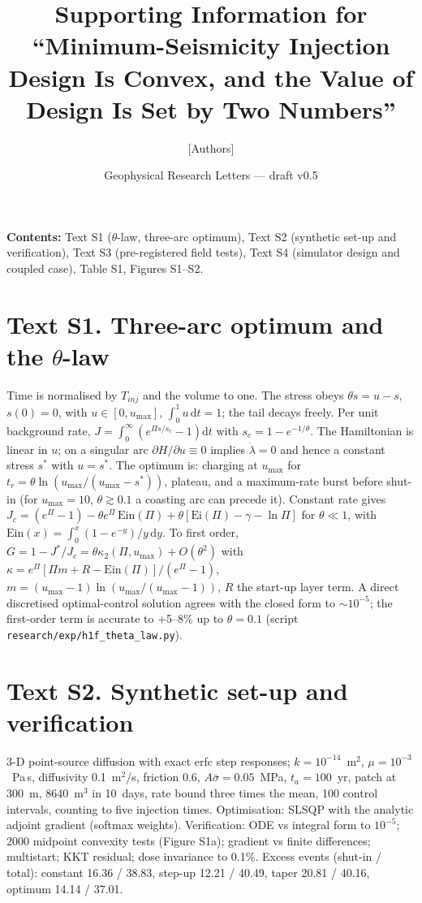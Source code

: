 \documentclass[11pt]{article}
\title{Supporting Information for ``Minimum-Seismicity Injection Design Is Convex, and the Value of Design Is Set by Two Numbers''}
\author{[Authors]}
\date{Geophysical Research Letters --- draft v0.5}
\begin{document}
\maketitle
\noindent\textbf{Contents:} Text S1 ($\theta$-law, three-arc optimum), Text S2 (synthetic set-up and verification), Text S3 (pre-registered
field tests), Text S4 (simulator design and coupled case), Table S1, Figures S1--S2.

\section*{Text S1. Three-arc optimum and the $\theta$-law}
Time is normalised by $T_{inj}$ and the volume to one. The stress obeys $\theta\dot s=u-s$, $s(0)=0$, with $u\in[0,u_{\max}]$,
$\int_0^1u\,\mathrm{d}t=1$; the tail decays freely. Per unit background rate, $J=\int_0^\infty(e^{\Pi s/s_c}-1)\mathrm{d}t$ with
$s_c=1-e^{-1/\theta}$. The Hamiltonian is linear in $u$; on a singular arc $\partial H/\partial u\equiv0$ implies $\dot\lambda=0$ and hence a
constant stress $s^*$ with $u=s^*$. The optimum is: charging at $u_{\max}$ for $t_r=\theta\ln(u_{\max}/(u_{\max}-s^*))$, plateau, and a
maximum-rate burst before shut-in (for $u_{\max}=10$, $\theta\gtrsim0.1$ a coasting arc can precede it). Constant rate gives
$J_c=(e^\Pi-1)-\theta e^\Pi\,\mathrm{Ein}(\Pi)+\theta[\mathrm{Ei}(\Pi)-\gamma-\ln\Pi]$ for $\theta\ll1$, with
$\mathrm{Ein}(x)=\int_0^x(1-e^{-y})/y\,\mathrm{d}y$. To first order, $G=1-J^*/J_c=\theta\kappa_2(\Pi,u_{\max})+O(\theta^2)$ with
$\kappa=e^\Pi[\Pi m+R-\mathrm{Ein}(\Pi)]/(e^\Pi-1)$, $m=(u_{\max}-1)\ln(u_{\max}/(u_{\max}-1))$, $R$ the start-up layer term.
A direct discretised optimal-control solution agrees with the closed form to $\sim10^{-5}$; the first-order term is accurate to +5--8\% up to
$\theta=0.1$ (script \texttt{research/exp/h1f\_theta\_law.py}).

\section*{Text S2. Synthetic set-up and verification}
3-D point-source diffusion with exact erfc step responses; $k=10^{-14}$~m$^2$, $\mu=10^{-3}$~Pa\,s, diffusivity 0.1~m$^2$/s, friction 0.6,
$A\bar\sigma=0.05$~MPa, $t_a=100$~yr, patch at 300~m, 8640~m$^3$ in 10~days, rate bound three times the mean, 100 control intervals,
counting to five injection times. Optimisation: SLSQP with the analytic adjoint gradient (softmax weights). Verification: ODE vs integral
form to $10^{-5}$; 2000 midpoint convexity tests (Figure S1a); gradient vs finite differences; multistart; KKT residual; dose invariance to
0.1\%. Excess events (shut-in / total): constant 16.36 / 38.83, step-up 12.21 / 40.49, taper 20.81 / 40.16, optimum 14.14 / 37.01.
\end{document}
